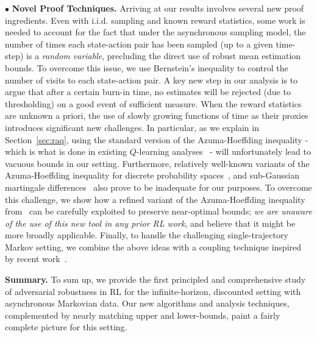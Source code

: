 \documentclass{article}
\begin{document}
$\bullet$ \textbf{Novel Proof Techniques.} Arriving at our results involves several new proof ingredients. Even with i.i.d. sampling and known reward statistics, some work is needed to account for the fact that under the asynchronous sampling model, the number of times each state-action pair has been sampled (up to a given time-step) is a \emph{random variable}, precluding the direct use of robust mean estimation bounds. To overcome this issue, we use Bernstein's inequality to control the number of visits to each state-action pair. A key new step in our analysis is to argue that after a certain burn-in time, no estimates will be rejected (due to thresholding) on a good event of sufficient measure. When the reward statistics are unknown a priori, the use of slowly growing functions of time as their proxies introduces significant new challenges. In particular, as we explain in Section~\ref{sec:raq}, using the standard version of the Azuma-Hoeffding inequality - which is what is done in existing \(Q\)-learning analyses~\cite{Qu} - will unfortunately lead to vacuous bounds in our setting. Furthermore, relatively well-known variants of the Azuma-Hoeffding inequality for discrete probability spaces~\cite{chung2006concentration}, and sub-Gaussian martingale differences~\cite{shamir2011variant} also prove to be inadequate for our purposes. To overcome this challenge, we show how a refined variant of the Azuma-Hoeffding inequality from~\citet{Shamir1987} can be carefully exploited to preserve near-optimal bounds; \emph{we are unaware of the use of this new tool in any prior RL work}, and believe that it might be more broadly applicable. Finally, to handle the challenging single-trajectory Markov setting, we combine the above ideas with a coupling technique  inspired by recent work~\cite{dorfman, nagaraj}. 

\textbf{Summary.} To sum up, we provide the first principled and comprehensive study of adversarial robustness in RL for the infinite-horizon, discounted setting with asynchronous Markovian data. Our new algorithms and analysis techniques, complemented by nearly matching upper and lower-bounds, paint a fairly complete picture for this setting. 
\end{document}
